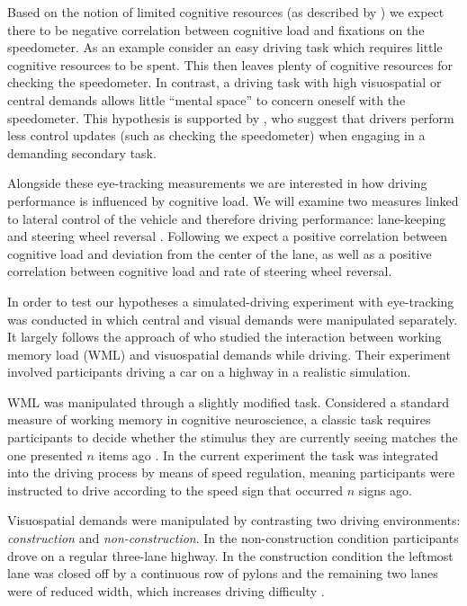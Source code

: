 Based on the notion of limited cognitive resources (as described by \citet{DeWaard1996}) we expect there to be negative correlation between cognitive load and fixations on the speedometer.
As an example consider an easy driving task which requires little cognitive resources to be spent.
This then leaves plenty of cognitive resources for checking the speedometer.
In contrast, a driving task with high visuospatial or central demands allows little ``mental space'' to concern oneself with the speedometer.
This hypothesis is supported by \citet{Salvucci2011}, who suggest that drivers perform less control updates (such as checking the speedometer) when engaging in a demanding secondary task.

Alongside these eye-tracking measurements we are interested in how driving performance is influenced by cognitive load.
We will examine two measures linked to lateral control of the vehicle and therefore driving performance: lane-keeping and steering wheel reversal \citep{Knappe2007}. 
Following \citet{Savino2009} we expect a positive correlation between cognitive load and deviation from the center of the lane,
as well as a positive correlation between cognitive load and rate of steering wheel reversal.

In order to test our hypotheses a simulated-driving experiment with eye-tracking was conducted in which central and visual demands were manipulated separately.
It largely follows the approach of \citet{Scheunemann2019} who studied the interaction between working memory load (WML) and visuospatial demands while driving.
Their experiment involved participants driving a car on a highway in a realistic simulation. 

WML was manipulated through a slightly modified \nback task. 
Considered a standard measure of working memory in cognitive neuroscience, a classic \nback task requires participants to decide whether the stimulus they are currently seeing matches the one presented \(n\) items ago \citep{Kane2007}.
In the current experiment the task was integrated into the driving process by means of speed regulation, meaning participants were instructed to drive according to the speed sign that occurred \(n\) signs ago.

Visuospatial demands were manipulated by contrasting two driving environments: \textit{construction} and \textit{non-construction}.
In the non-construction condition participants drove on a regular three-lane highway.
In the construction condition the leftmost lane was closed off by a continuous row of pylons and the remaining two lanes were of reduced width, which increases driving difficulty \citep{Liu2016}.